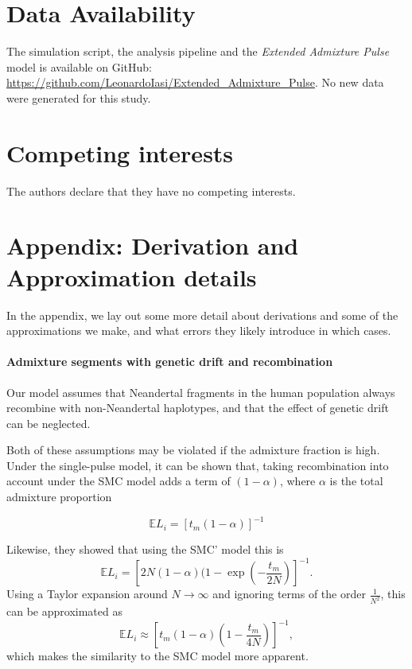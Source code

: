 \documentclass[11pt]{article}
\let\oldparagraph\paragraph
\renewcommand{\paragraph}[1]{\oldparagraph{#1}\mbox{}}
\begin{document}
\section{Data Availability}\label{Data Availability}

The simulation script, the analysis pipeline and the \emph{Extended Admixture Pulse} model is  available  on  GitHub: \url{https://github.com/LeonardoIasi/Extended_Admixture_Pulse}. No new data were generated for this study.

\section{Competing interests}

The authors declare that they have no competing interests.

\hypertarget{refs}{}


\appendix
\section{Appendix: Derivation and Approximation details}
In the appendix, we lay out some more detail about derivations and some of the approximations we make, and what errors they likely introduce in which cases.

\paragraph{Admixture segments with genetic drift and recombination}
Our model assumes that Neandertal fragments in the human population always recombine with non-Neandertal haplotypes, and that the effect of genetic drift can be neglected. 

Both of these assumptions may be violated if the admixture fraction is high. Under the single-pulse model, it can be shown that, taking recombination into account under the SMC model \cite{mcvean_approximating_2005}  adds a term of $(1-\alpha)$, where $\alpha$ is the total admixture proportion \cite{liang_lengths_2014}

\begin{equation}
    \mathbb{E}L_i = \left[t_m (1-\alpha) \right]^{-1}
\end{equation}

Likewise, they showed that using the SMC' model \citep{marjoram_fast_2006} this is
$$
\mathbb{E}L_i = \left[2N(1-\alpha)(1-\exp\left(-\frac{t_m}{2N}\right)\right]^{-1} \text{.}
$$
Using a Taylor expansion around $N \to \infty$ and ignoring terms of the order $\frac{1}{N^2}$, this can be approximated as 
\begin{equation}
  \mathbb{E}L_i \approx  \left[t_m(1-\alpha)\left(1-\frac{t_m}{4N}\right)\right]^{-1},
\end{equation}
which makes the similarity to the SMC model more apparent.
\end{document}
